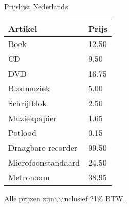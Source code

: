 \documentclass[a4paper]{article}
\begin{document}
\Large{Prijslijst Nederlands}

\vspace{8mm}

\begin{tabular}{ll}\\ \hline
{\bfseries Artikel} &
{\bfseries Prijs} \\ \hline\hline
Boek &12.50 \\CD &9.50 \\DVD &16.75 \\Bladmuziek &5.00 \\Schrijfblok &2.50 \\Muziekpapier &1.65 \\Potlood &0.15 \\Draagbare recorder &99.50 \\Microfoonstandaard &24.50 \\Metronoom &38.95\\\hline
\end{tabular}

Alle prijzen zijn\ensuremath{\backslash}\ensuremath{\backslash}inclusief 21\% BTW.
\end{document}
